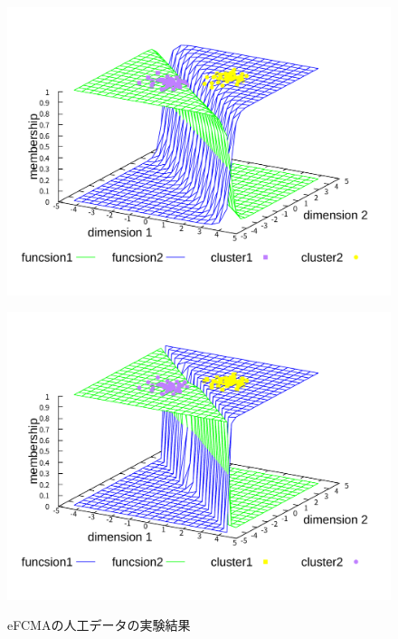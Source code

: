 \documentclass[a4j,12pt,dvipdfmx,oneside]{jsbook}
\theoremstyle{definition}
\begin{document}
\begin{figure}[htbp]
 \centering
 \begin{minipage}{0.43\hsize}
  \includegraphics[width=\linewidth]{eFCMA-Lambda1.pdf}
  \label{fig:eFCMA-Lambda1}
 \end{minipage}
 \begin{minipage}{0.43\hsize}
  \includegraphics[width=\linewidth]{eFCMA-Lambda10.pdf}
  \label{fig:eFCMA-Lambda10}
 \end{minipage}
 \vspace*{0.5cm}
 \caption{eFCMAの人工データの実験結果}
\end{figure}
\end{document}
